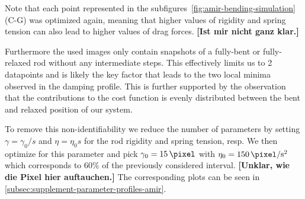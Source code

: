\documentclass{article}
\begin{document}
Note that each point represented in the subfigures~\ref{fig:amir-bending-simulation} (C-G) was
optimized again, meaning that higher values of rigidity and spring tension can also lead to higher
values of drag forces.
\textbf{[Ist mir nicht ganz klar.]}

Furthermore the used images only contain snapshots of a fully-bent or fully-relaxed rod without any
intermediate steps.
This effectively limits us to 2 datapoints and is likely the key factor that leads to the two local
minima observed in the damping profile.
This is further supported by the observation that the contributions to the cost function is evenly
distributed between the bent and relaxed position of our system.

To remove this non-identifiability we reduce the number of parameters by setting $\gamma=\gamma_0/s$
and $\eta=\eta_0 s$ for the rod rigidity and spring tension, resp.
We then optimize for this parameter and pick $\gamma_0=\SI{15}{\pixel}$ with
$\eta_0=\SI{150}{\pixel\per\second\squared}$ which corresponds to $60\%$ of the previously considered
interval. \textbf{[Unklar, wie die Pixel hier auftauchen.]}
The corresponding plots can be seen in \ref{subsec:supplement-parameter-profiles-amir}.
\end{document}
